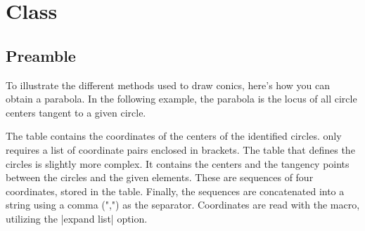\newpage

\section{Class } %
\label{sec:class_iclass_conic}

\subsection{Preamble} %
\label{sub:preamble}
To illustrate the different methods used to draw conics, here's how you can obtain a parabola. In the following example, the parabola is the locus of all circle centers tangent to a given circle.

The  table contains the coordinates of the centers of the identified circles. \TIKZ only requires a list of coordinate pairs enclosed in brackets.
The table that defines the circles is slightly more complex. It contains the centers and the tangency points between the circles and the given elements. These are sequences of four coordinates, stored in the table. Finally, the sequences are concatenated into a string using a comma (",") as the separator. Coordinates are read with the  macro, utilizing the |expand list| option.


\begin{center}
\end{center}

